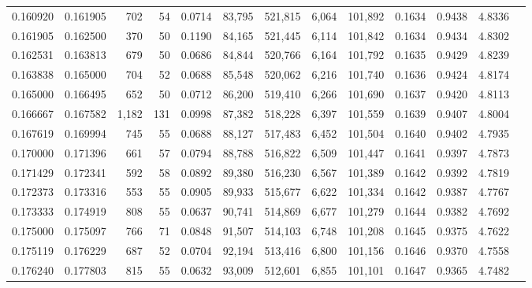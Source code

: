 \begin{tabular}{rrrrrrrrrrrrr}
0.160920 & 0.161905 &    702 &    54 &                                     0.0714 &  83,795 & 521,815 &   6,064 & 101,892 & 0.1634 & 0.9438 & 4.8336 \\
0.161905 & 0.162500 &    370 &    50 &                                     0.1190 &  84,165 & 521,445 &   6,114 & 101,842 & 0.1634 & 0.9434 & 4.8302 \\
0.162531 & 0.163813 &    679 &    50 &                                     0.0686 &  84,844 & 520,766 &   6,164 & 101,792 & 0.1635 & 0.9429 & 4.8239 \\
0.163838 & 0.165000 &    704 &    52 &                                     0.0688 &  85,548 & 520,062 &   6,216 & 101,740 & 0.1636 & 0.9424 & 4.8174 \\
0.165000 & 0.166495 &    652 &    50 &                                     0.0712 &  86,200 & 519,410 &   6,266 & 101,690 & 0.1637 & 0.9420 & 4.8113 \\
0.166667 & 0.167582 &  1,182 &   131 &                                     0.0998 &  87,382 & 518,228 &   6,397 & 101,559 & 0.1639 & 0.9407 & 4.8004 \\
0.167619 & 0.169994 &    745 &    55 &                                     0.0688 &  88,127 & 517,483 &   6,452 & 101,504 & 0.1640 & 0.9402 & 4.7935 \\
0.170000 & 0.171396 &    661 &    57 &                                     0.0794 &  88,788 & 516,822 &   6,509 & 101,447 & 0.1641 & 0.9397 & 4.7873 \\
0.171429 & 0.172341 &    592 &    58 &                                     0.0892 &  89,380 & 516,230 &   6,567 & 101,389 & 0.1642 & 0.9392 & 4.7819 \\
0.172373 & 0.173316 &    553 &    55 &                                     0.0905 &  89,933 & 515,677 &   6,622 & 101,334 & 0.1642 & 0.9387 & 4.7767 \\
0.173333 & 0.174919 &    808 &    55 &                                     0.0637 &  90,741 & 514,869 &   6,677 & 101,279 & 0.1644 & 0.9382 & 4.7692 \\
0.175000 & 0.175097 &    766 &    71 &                                     0.0848 &  91,507 & 514,103 &   6,748 & 101,208 & 0.1645 & 0.9375 & 4.7622 \\
0.175119 & 0.176229 &    687 &    52 &                                     0.0704 &  92,194 & 513,416 &   6,800 & 101,156 & 0.1646 & 0.9370 & 4.7558 \\
0.176240 & 0.177803 &    815 &    55 &                                     0.0632 &  93,009 & 512,601 &   6,855 & 101,101 & 0.1647 & 0.9365 & 4.7482 \\

\end{tabular}
